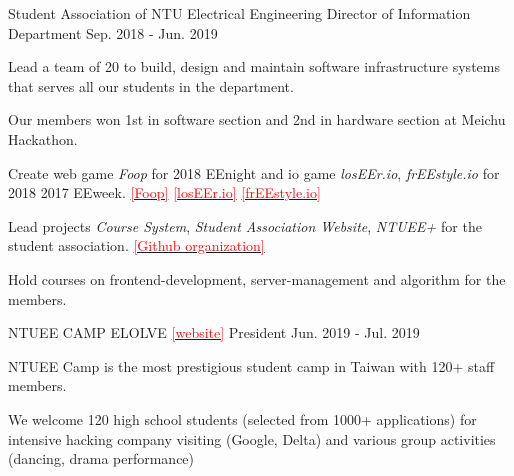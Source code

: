 

\begin{cventries}

  \cventry
    {Student Association of NTU Electrical Engineering} %
    {Director of Information Department} %
    {} %
    {Sep. 2018 - Jun. 2019} %
    {
      \begin{cvitems} %
        \item {Lead a team of 20 to build, design and maintain software infrastructure systems that serves all our students in the department.}
        \item {Our members won 1st in software section and 2nd in hardware section at Meichu Hackathon.}
        \item {Create web game \textit{Foop} for 2018 EEnight and io game \textit{losEEr.io}, \textit{frEEstyle.io} for 2018 2017 EEweek.} \href{https://github.com/ByronHsu/Foop}{\textcolor{red}{[Foop]}} \href{https://github.com/ByronHsu/losEEr.io}{\textcolor{red}{[losEEr.io]}} \href{https://github.com/HowardMHJuan/2017EEweek}{\textcolor{red}{[frEEstyle.io]}}
        \item {Lead projects \textit{Course System}, \textit{Student Association Website}, \textit{NTUEE+} for the student association.} \href{https://github.com/NTUEEInfoDep}{\textcolor{red}{[Github organization]}}
        \item {Hold courses on frontend-development, server-management and algorithm for the members.}
      \end{cvitems}
    }

  \cventry
    {NTUEE CAMP ELOLVE \href{https://byronhsu.github.io/2019eecamp/}{\textcolor{red}{[website]}}} %
    {President} %
    {} %
    {Jun. 2019 - Jul. 2019} %
    {
      \begin{cvitems} %
        \item {NTUEE Camp is the most prestigious student camp in Taiwan with 120+ staff members.}
        \item {We welcome 120 high school students (selected from 1000+ applications) for intensive hacking company visiting (Google, Delta) and various group activities (dancing, drama performance)}
      \end{cvitems}
    }
\end{cventries}
